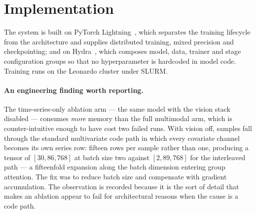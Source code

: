 \section{Implementation}
\label{sec:impl}

The system is built on PyTorch Lightning~\cite{lightning}, which separates the training
lifecycle from the architecture and supplies distributed training, mixed precision and
checkpointing; and on Hydra~\cite{hydra}, which composes model, data, trainer and stage
configuration groups so that no hyperparameter is hardcoded in model code. Training runs on
the Leonardo cluster under SLURM.

\paragraph{An engineering finding worth reporting.} The time-series-only ablation arm ---
the same model with the vision stack disabled --- consumes \emph{more} memory than the full
multimodal arm, which is counter-intuitive enough to have cost two failed runs. With vision
off, samples fall through the standard multivariate code path in which every covariate
channel becomes its own series row: fifteen rows per sample rather than one, producing a
tensor of $[30, 86, 768]$ at batch size two against $[2, 89, 768]$ for the interleaved path
--- a fifteenfold expansion along the batch dimension entering group attention. The fix was
to reduce batch size and compensate with gradient accumulation. The observation is recorded
because it is the sort of detail that makes an ablation appear to fail for architectural
reasons when the cause is a code path.

\par

